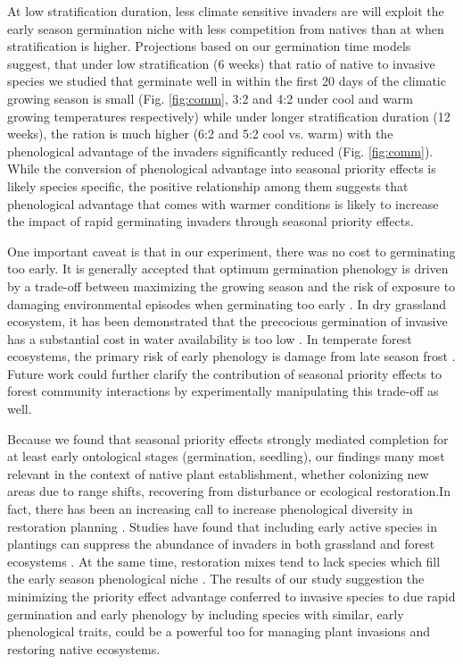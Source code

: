 \documentclass{article}\usepackage[]{graphicx}\usepackage[]{color}
\begin{document}
{At low stratification duration, less climate sensitive invaders are will exploit the early season germination niche with less competition from natives than at when stratification is higher. Projections based on our germination time models suggest, that under low stratification (6 weeks) that ratio of native to invasive species we studied that germinate well in within the first 20 days of the climatic growing season is small (Fig. \ref{fig:comm}, 3:2 and 4:2 under cool and warm growing temperatures respectively) while under longer stratification duration (12 weeks), the ration is much higher (6:2 and 5:2 cool vs. warm) with the phenological advantage of the invaders significantly reduced (Fig. \ref{fig:comm}). While the conversion of phenological advantage into seasonal priority effects is likely species specific, the positive relationship among them suggests that phenological advantage that comes with warmer conditions is likely to increase the impact of rapid germinating invaders through seasonal priority effects. 

One important caveat is that in our experiment, there was no cost to germinating too early. It is generally accepted that optimum germination phenology is driven by a trade-off between maximizing the growing season and the risk of exposure to damaging environmental episodes when germinating too early \citep{}. In dry grassland ecosystem, it has been demonstrated that the precocious germination of invasive has a substantial cost in water availability is too low \citep{}. In temperate forest ecosystems, the primary risk of early phenology is damage from late season frost \citep{}. Future work could further clarify the contribution of seasonal priority effects to forest community interactions by experimentally manipulating this trade-off as well.

Because we found that seasonal priority effects strongly mediated completion for at least early ontological stages (germination, seedling), our findings many most relevant in the context of native plant establishment, whether colonizing new areas due to range shifts, recovering from disturbance or ecological restoration.In fact, there has been an increasing call to increase phenological diversity in restoration planning \citep{Hess:2019vn}. Studies have found that including early active species in plantings can suppress the abundance of invaders in both grassland \citep{Cleland:2013wo} and forest ecosystems \citep{Schuster:2020ww}. At the same time, restoration mixes tend to lack species which fill the early season phenological niche \citep{Havens:2016vo}. The results of our study suggestion the minimizing the priority effect advantage conferred to invasive species to due rapid germination and early phenology by including species with similar, early phenological traits, could be a powerful too for managing plant invasions and restoring native ecosystems.

}
\end{document}
